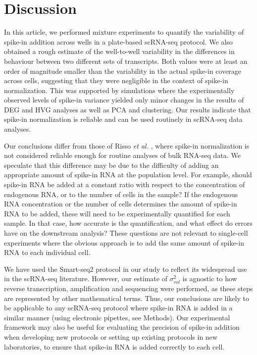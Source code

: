 \documentclass{article}
\begin{document}
\section{Discussion}
In this article, we performed mixture experiments to quantify the variability of spike-in addition across wells in a plate-based scRNA-seq protocol.
We also obtained a rough estimate of the well-to-well variability in the differences in behaviour between two different sets of transcripts.
Both values were at least an order of magnitude smaller than the variability in the actual spike-in coverage across cells, suggesting that they were negligible in the context of spike-in normalization.
This was supported by simulations where the experimentally observed levels of spike-in variance yielded only minor changes in the results of DEG and HVG analyses as well as PCA and clustering.
Our results indicate that spike-in normalization is reliable and can be used routinely in scRNA-seq data analyses.

Our conclusions differ from those of Risso \textit{et al.} \cite{risso2014normalization}, where spike-in normalization is not considered reliable enough for routine analyses of bulk RNA-seq data.
We speculate that this difference may be due to the difficulty of adding an appropriate amount of spike-in RNA at the population level.
For example, should spike-in RNA be added at a constant ratio with respect to the concentration of endogenous RNA, or to the number of cells in the sample?
If the endogenous RNA concentration or the number of cells determines the amount of spike-in RNA to be added, these will need to be experimentally quantified for each sample.
In that case, how accurate is the quantification, and what effect do errors have on the downstream analysis?
These questions are not relevant to single-cell experiments where the obvious approach is to add the same amount of spike-in RNA to each individual cell.

We have used the Smart-seq2 protocol in our study to reflect its widespread use in the scRNA-seq literature.
However, our estimate of $\sigma^2_{vol}$ is agnostic to how reverse transcription, amplification and sequencing were performed, as these steps are represented by other mathematical terms.
Thus, our conclusions are likely to be applicable to any scRNA-seq protocol where spike-in RNA is added in a similar manner (using electronic pipettes, see Methods).
Our experimental framework may also be useful for evaluating the precision of spike-in addition when developing new protocols or setting up existing protocols in new laboratories, to ensure that spike-in RNA is added correctly to each cell.
\end{document}
